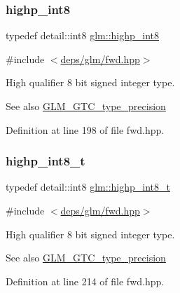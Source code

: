 \subsubsection{\texorpdfstring{highp\+\_\+int8}{highp\_int8}}
{\footnotesize\ttfamily typedef detail\+::int8 \hyperlink{group__gtc__type__precision_ga57c86999e666760c304453f9bfdc09d1}{glm\+::highp\+\_\+int8}}



{\ttfamily \#include $<$\hyperlink{fwd_8hpp}{deps/glm/fwd.\+hpp}$>$}

High qualifier 8 bit signed integer type. \begin{DoxySeeAlso}{See also}
\hyperlink{group__gtc__type__precision}{G\+L\+M\+\_\+\+G\+T\+C\+\_\+type\+\_\+precision} 
\end{DoxySeeAlso}


Definition at line 198 of file fwd.\+hpp.

\mbox{\label{group__gtc__type__precision_ga417701b99e6e7992f35ab2ef694f88b2}} 
\subsubsection{\texorpdfstring{highp\+\_\+int8\+\_\+t}{highp\_int8\_t}}
{\footnotesize\ttfamily typedef detail\+::int8 \hyperlink{group__gtc__type__precision_ga417701b99e6e7992f35ab2ef694f88b2}{glm\+::highp\+\_\+int8\+\_\+t}}



{\ttfamily \#include $<$\hyperlink{fwd_8hpp}{deps/glm/fwd.\+hpp}$>$}

High qualifier 8 bit signed integer type. \begin{DoxySeeAlso}{See also}
\hyperlink{group__gtc__type__precision}{G\+L\+M\+\_\+\+G\+T\+C\+\_\+type\+\_\+precision} 
\end{DoxySeeAlso}


Definition at line 214 of file fwd.\+hpp.

\mbox{\label{group__gtc__type__precision_ga9da2178d7501d9c0f225fa1a7b70cb45}} 

